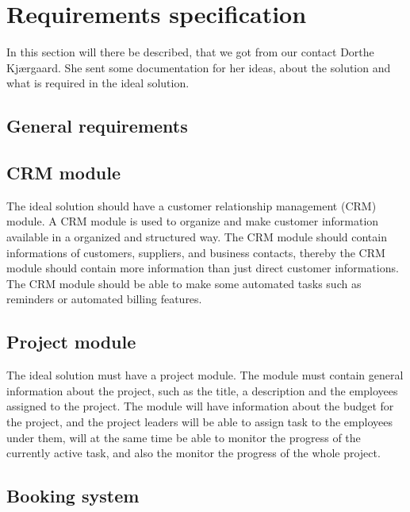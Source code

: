 \section{Requirements specification}
In this section will there be described, that we got from our contact Dorthe Kjærgaard. She sent some documentation for her ideas, about the solution and what is required in the ideal solution. 

\subsection{General requirements}

\subsection{CRM module}

The ideal solution should have a customer relationship management (CRM) module. A CRM module is used to organize and make customer information available in a organized and structured way. The CRM module should contain informations of customers, suppliers, and business contacts, thereby the CRM module should contain more information than just direct customer informations.\\

The CRM module should be able to make some automated tasks such as reminders or automated billing features. 

\subsection{Project module}
The ideal solution must have a project module. The module must contain general information about the project, such as the title, a description and the employees assigned to the project. The module will have information about the budget for the project, and the project leaders will be able to assign task to the employees under them, will at the same time be able to monitor the progress of the currently active task, and also the monitor the progress of the whole project.

\subsection{Booking system}


